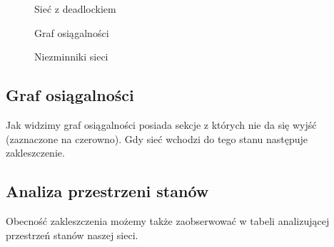 \begin{figure}[h!]
	\caption{Sieć z deadlockiem}
	\label{zad2:graph1}
\end{figure}

\begin{figure}[h!]
	\caption{Graf osiągalności}
	\label{zad2:graph1}
\end{figure}
\begin{figure}[h!]
	\caption{Niezminniki sieci}
	\label{zad2:graph1}
\end{figure}

\subsection{Graf osiągalności}
Jak widzimy graf osiągalności posiada sekcje z których nie da się wyjść 
(zaznaczone na czerowno). Gdy sieć wchodzi do tego stanu następuje zakleszczenie.

\subsection{Analiza przestrzeni stanów}
Obecność zakleszczenia możemy także zaobserwować w tabeli analizującej 
przestrzeń stanów naszej sieci.